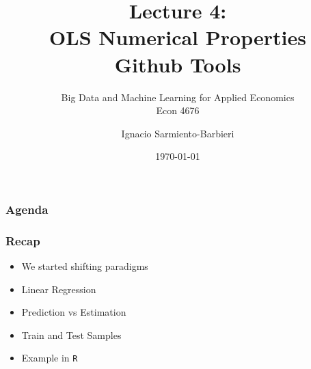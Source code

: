 \documentclass[
  shownotes,
  xcolor={svgnames},
  hyperref={colorlinks,citecolor=DarkBlue,linkcolor=DarkRed,urlcolor=DarkBlue}
  ]{beamer}
\begin{document}
\title[Lecture 4]{Lecture 4: \\ OLS Numerical Properties \\ Github Tools}
\subtitle{Big Data and Machine Learning for Applied Economics \\ Econ 4676}
\date{\today}

\author[Sarmiento-Barbieri]{Ignacio Sarmiento-Barbieri}


\begin{frame}[noframenumbering]
\maketitle
\end{frame}





\begin{frame}
\frametitle{Agenda}

\tableofcontents


\end{frame}



\begin{frame}
\frametitle{Recap}

\begin{itemize} 
    \item We started shifting paradigms
    \bigskip
    \item Linear Regression
    \bigskip
    \item Prediction vs Estimation
    \bigskip
    \item Train and Test Samples
    \bigskip
    \item Example in \texttt{R}
\end{itemize}
\end{frame}



\end{document}
